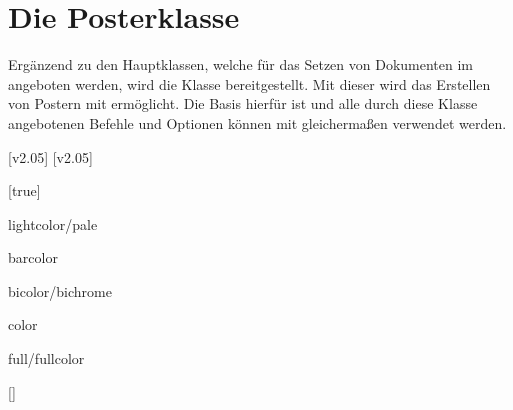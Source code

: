 \chapter[Die Klasse tudscrposter]{Die Posterklasse}
%
%
\begin{Bundle*}[v2.05]{}
%
\printchangedatlist%
%
Ergänzend zu den Hauptklassen, welche für das Setzen von Dokumenten im \TUDCD 
angeboten werden, wird die Klasse  bereitgestellt. Mit 
dieser wird das Erstellen von Postern mit  ermöglicht. Die Basis 
hierfür ist  und alle durch diese Klasse angebotenen Befehle 
und Optionen können mit  gleichermaßen verwendet werden.

[v2.05]
[v2.05]

\begin{Declaration}[v2.05]{}[true]
\printdeclarationlist%
\begin{values}{}
\itemfalse
{}
\item[lightcolor/pale]
\item[barcolor]
\item[bicolor/bichrome]
\item[color]
\item[full/fullcolor]
\end{values}
\end{Declaration}



\begin{Declaration}[v2.05]{[]}
\printdeclarationlist%
\end{Declaration}


\end{Bundle*}

